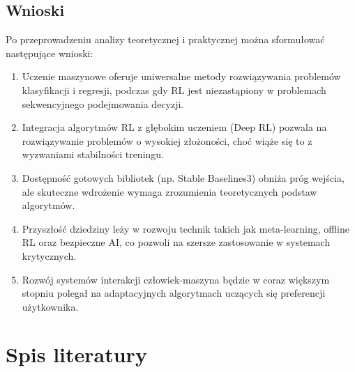 \documentclass[12pt,a4paper]{article}
\begin{document}
\subsection{Wnioski}

Po przeprowadzeniu analizy teoretycznej i praktycznej można sformułować następujące wnioski:

\begin{enumerate}
\item Uczenie maszynowe oferuje uniwersalne metody rozwiązywania problemów klasyfikacji i regresji, podczas gdy RL jest niezastąpiony w problemach sekwencyjnego podejmowania decyzji.
\item Integracja algorytmów RL z głębokim uczeniem (Deep RL) pozwala na rozwiązywanie problemów o wysokiej złożoności, choć wiąże się to z wyzwaniami stabilności treningu.
\item Dostępność gotowych bibliotek (np. Stable Baselines3) obniża próg wejścia, ale skuteczne wdrożenie wymaga zrozumienia teoretycznych podstaw algorytmów.
\item Przyszłość dziedziny leży w rozwoju technik takich jak meta-learning, offline RL oraz bezpieczne AI, co pozwoli na szersze zastosowanie w systemach krytycznych.
\item Rozwój systemów interakcji człowiek-maszyna będzie w coraz większym stopniu polegał na adaptacyjnych algorytmach uczących się preferencji użytkownika.
\end{enumerate}

\newpage

\section{Spis literatury}
\end{document}
